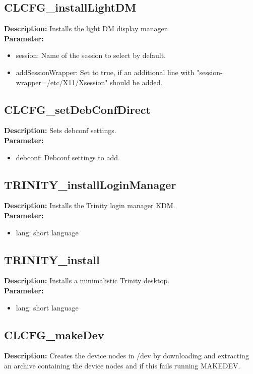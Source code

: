 \subsection{CLCFG\_installLightDM}
\textbf{Description:} Installs the light DM display manager.\\
\textbf{Parameter:}
\begin{itemize}
\item session: Name of the session to select by default.
\item addSessionWrapper: Set to true, if an additional line with "session-wrapper=/etc/X11/Xsession" should be added.
\end{itemize}

\subsection{CLCFG\_setDebConfDirect}
\textbf{Description:} Sets debconf settings.\\
\textbf{Parameter:}
\begin{itemize}
\item debconf: Debconf settings to add.
\end{itemize}

\subsection{TRINITY\_installLoginManager}
\textbf{Description:} Installs the Trinity login manager KDM.\\
\textbf{Parameter:}
\begin{itemize}
\item lang: short language
\end{itemize}

\subsection{TRINITY\_install}
\textbf{Description:} Installs a minimalistic Trinity desktop.\\
\textbf{Parameter:}
\begin{itemize}
\item lang: short language
\end{itemize}

\subsection{CLCFG\_makeDev}
\textbf{Description:} Creates the device nodes in /dev by downloading and extracting an archive containing the device nodes and if this fails running MAKEDEV.\\


